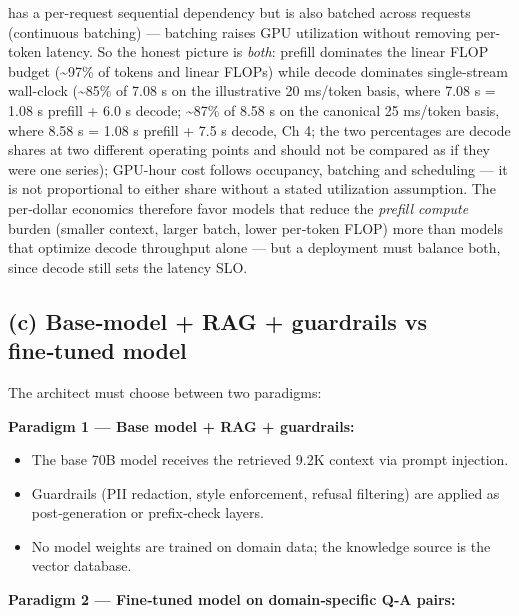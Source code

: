 has a per-request sequential dependency but is also batched across
requests (continuous batching) --- batching raises GPU utilization
without removing per-token latency. So the honest picture is
\emph{both}: prefill dominates the linear FLOP budget
(\textasciitilde97\% of tokens and linear FLOPs) while decode dominates
single-stream wall-clock (\textasciitilde85\% of 7.08 s on the
illustrative 20 ms/token basis, where 7.08 s = 1.08 s prefill + 6.0 s
decode; \textasciitilde87\% of 8.58 s on the canonical 25 ms/token
basis, where 8.58 s = 1.08 s prefill + 7.5 s decode, Ch 4; the two
percentages are decode shares at two different operating points and
should not be compared as if they were one series); GPU-hour cost
follows occupancy, batching and scheduling --- it is not proportional to
either share without a stated utilization assumption. The per‑dollar
economics therefore favor models that reduce the \emph{prefill compute}
burden (smaller context, larger batch, lower per‑token FLOP) more than
models that optimize decode throughput alone --- but a deployment must
balance both, since decode still sets the latency SLO.

\subsection{(c) Base‑model + RAG + guardrails vs fine‑tuned
model}\label{c-basemodel-rag-guardrails-vs-finetuned-model}

The architect must choose between two paradigms:

\textbf{Paradigm 1 --- Base model + RAG + guardrails:}

\begin{itemize}
\tightlist
\item
  The base 70B model receives the retrieved 9.2K context via prompt
  injection.
\item
  Guardrails (PII redaction, style enforcement, refusal filtering) are
  applied as post‑generation or prefix‑check layers.
\item
  No model weights are trained on domain data; the knowledge source is
  the vector database.
\end{itemize}

\textbf{Paradigm 2 --- Fine‑tuned model on domain‑specific Q‑A pairs:}


